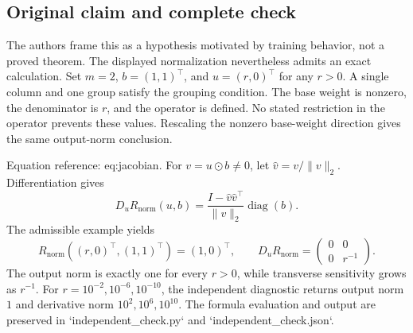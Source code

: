 \documentclass[10pt]{article}
\begin{document}
\subsection*{Original claim and complete check}
The authors frame this as a hypothesis motivated by training behavior, not a proved theorem. The displayed normalization nevertheless admits an exact calculation. Set \(m=2\), \(b=(1,1)^\top\), and \(u=(r,0)^\top\) for any \(r>0\). A single column and one group satisfy the grouping condition. The base weight is nonzero, the denominator is \(r\), and the operator is defined. No stated restriction in the operator prevents these values. Rescaling the nonzero base-weight direction gives the same output-norm conclusion.\par
Equation reference: eq:jacobian. For \(v=u\odot b\ne0\), let \(\widehat v=v/\|v\|_2\). Differentiation gives \[D_u R_{\mathrm{norm}}(u,b)
 =\frac{I-\widehat v\widehat v^\top}{\|v\|_2}\operatorname{diag}(b).
 \] The admissible example yields \[R_{\mathrm{norm}}((r,0)^\top,(1,1)^\top)=(1,0)^\top,\qquad
 D_uR_{\mathrm{norm}}=
 \begin{pmatrix}0&0\\0&r^{-1}\end{pmatrix}.\] The output norm is exactly one for every \(r>0\), while transverse sensitivity grows as \(r^{-1}\). For \(r=10^{-2},10^{-6},10^{-10}\), the independent diagnostic returns output norm \(1\) and derivative norm \(10^2,10^6,10^{10}\). The formula evaluation and output are preserved in `independent\_check.py` and `independent\_check.json`.\par
\end{document}
